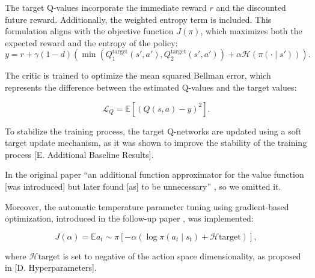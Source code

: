 The target Q-values incorporate the immediate reward \( r\) and the discounted future reward. Additionally, the weighted entropy term is included. This formulation aligns with the objective function \( J(\pi) \), which maximizes both the expected reward and the entropy of the policy:
\begin{equation}
    y = r + \gamma (1 - d) \left( \min \left( Q_1^{\text{target}}(s', a'), Q_2^{\text{target}}(s', a') \right) + \alpha \mathcal{H}(\pi(\cdot \mid s')) \right).
\end{equation}


The critic is trained to optimize the mean squared Bellman error, which represents the difference between the estimated Q-values and the target values:

\begin{equation} \mathcal{L}_{Q} = \mathbb{E} \left[ (Q(s, a) - y)^2 \right]. \end{equation}


To stabilize the training process, the target Q-networks are updated using a soft target update mechanism,
as it was shown to improve the stability of the training process \cite{HaarnojaAbbeelLevine2018:SAC}[E. Additional Baseline Results].

In the original paper ``an additional function approximator for the value function [was introduced] but later found [as] to be unnecessary'' \cite{haarnoja2019softactorcriticalgorithmsapplications}, so we omitted it.

Moreover, the automatic temperature parameter tuning using gradient-based optimization, introduced in the follow-up paper \cite{haarnoja2019softactorcriticalgorithmsapplications}, was implemented:

\begin{equation} J(\alpha) = \mathbb{E}{a_t \sim \pi} \left[ -\alpha \left( \log \pi(a_t \mid s_t) + \mathcal{H}{\text{target}} \right) \right], \end{equation}

where $\mathcal{H}\text{target}$ is set to negative of the action space dimensionality, as proposed in \cite{haarnoja2019softactorcriticalgorithmsapplications}[D. Hyperparameters].
